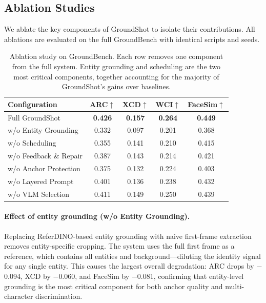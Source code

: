 \subsection{Ablation Studies}

We ablate the key components of GroundShot to isolate their contributions. All ablations are evaluated on the full GroundBench with identical scripts and seeds.

\begin{table}[t]
\centering
\caption{Ablation study on GroundBench. Each row removes one component from the full system. Entity grounding and scheduling are the two most critical components, together accounting for the majority of GroundShot's gains over baselines.}
\label{tab:ablation}
\vspace{0.3em}
\footnotesize
\setlength{\tabcolsep}{3pt}
\begin{tabular*}{\columnwidth}{@{\extracolsep{\fill}}L{0.36\columnwidth}|ccc|c}
\toprule
\textbf{Configuration} & \textbf{ARC}$\uparrow$ & \textbf{XCD}$\uparrow$ & \textbf{WCI}$\uparrow$ & \textbf{FaceSim}$\uparrow$ \\
\midrule
Full GroundShot              & \textbf{0.426} & \textbf{0.157} & \textbf{0.264} & \textbf{0.449} \\
\midrule
w/o Entity Grounding         & 0.332 & 0.097 & 0.201 & 0.368 \\
w/o Scheduling               & 0.355 & 0.141 & 0.210 & 0.415 \\
w/o Feedback \& Repair       & 0.387 & 0.143 & 0.214 & 0.421 \\
w/o Anchor Protection        & 0.375 & 0.132 & 0.224 & 0.403 \\
w/o Layered Prompt           & 0.401 & 0.136 & 0.238 & 0.432 \\
w/o VLM Selection            & 0.411 & 0.149 & 0.250 & 0.439 \\
\bottomrule
\end{tabular*}
\end{table}

\paragraph{Effect of entity grounding (w/o Entity Grounding).}
Replacing ReferDINO-based entity grounding with naive first-frame extraction removes entity-specific cropping. The system uses the full first frame as a reference, which contains all entities and background---diluting the identity signal for any single entity. This causes the largest overall degradation: ARC drops by $-$0.094, XCD by $-$0.060, and FaceSim by $-$0.081, confirming that entity-level grounding is the most critical component for both anchor quality and multi-character discrimination.

